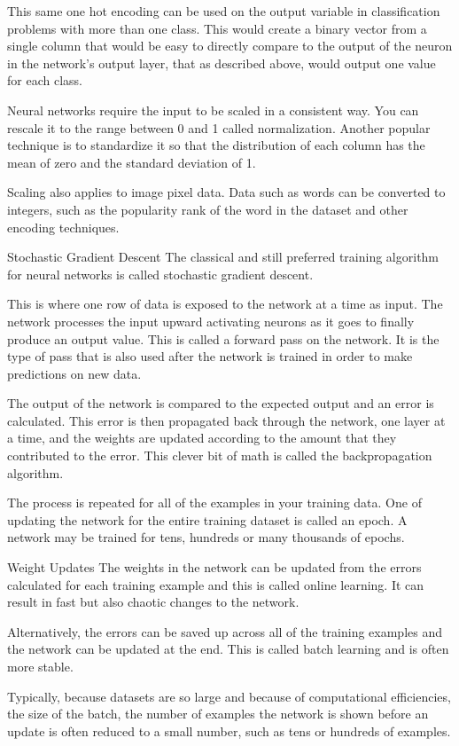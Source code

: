 \documentclass[12pt]{article}
\begin{document}
This same one hot encoding can be used on the output variable in classification problems with more than one class. This would create a binary vector from a single column that would be easy to directly compare to the output of the neuron in the network’s output layer, that as described above, would output one value for each class.

Neural networks require the input to be scaled in a consistent way. You can rescale it to the range between 0 and 1 called normalization. Another popular technique is to standardize it so that the distribution of each column has the mean of zero and the standard deviation of 1.

Scaling also applies to image pixel data. Data such as words can be converted to integers, such as the popularity rank of the word in the dataset and other encoding techniques.

Stochastic Gradient Descent
The classical and still preferred training algorithm for neural networks is called stochastic gradient descent.

This is where one row of data is exposed to the network at a time as input. The network processes the input upward activating neurons as it goes to finally produce an output value. This is called a forward pass on the network. It is the type of pass that is also used after the network is trained in order to make predictions on new data.

The output of the network is compared to the expected output and an error is calculated. This error is then propagated back through the network, one layer at a time, and the weights are updated according to the amount that they contributed to the error. This clever bit of math is called the backpropagation algorithm.

The process is repeated for all of the examples in your training data. One of updating the network for the entire training dataset is called an epoch. A network may be trained for tens, hundreds or many thousands of epochs.

Weight Updates
The weights in the network can be updated from the errors calculated for each training example and this is called online learning. It can result in fast but also chaotic changes to the network.

Alternatively, the errors can be saved up across all of the training examples and the network can be updated at the end. This is called batch learning and is often more stable.

Typically, because datasets are so large and because of computational efficiencies, the size of the batch, the number of examples the network is shown before an update is often reduced to a small number, such as tens or hundreds of examples.
\end{document}
